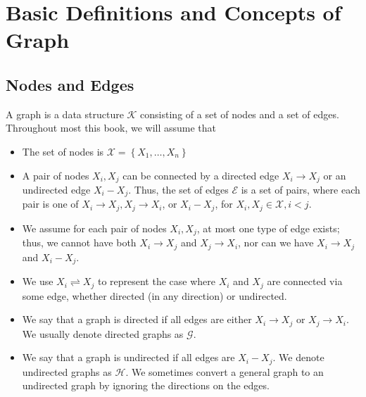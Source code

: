 \documentclass{article}
\begin{document}
\section{Basic Definitions and Concepts of Graph}
\subsection{Nodes and Edges}
A graph is a data structure $\mathcal{K}$ consisting of a set of nodes and a set of edges. Throughout most this book, we will assume that
\begin{itemize}
    \item The set of nodes is $\mathcal{X}=\left\{X_{1}, \ldots, X_{n}\right\}$
    \item A pair of nodes $X_{i}, X_{j}$ can be connected by a directed edge $X_{i} \rightarrow X_{j}$ or an undirected edge $X_{i}-X_{j}$. Thus, the set of edges $\mathcal{E}$ is a set of pairs, where each pair is one of $X_{i} \rightarrow X_{j}, X_{j} \rightarrow X_{i}$, or $X_{i}-X_{j}$, for $X_{i}, X_{j} \in \mathcal{X}, i<j$.
    \item  We assume  for each pair of nodes $X_{i}, X_{j}$, at most one type of edge exists; thus, we cannot have both $X_{i} \rightarrow X_{j}$ and $X_{j} \rightarrow X_{i}$, nor can we have $X_{i} \rightarrow X_{j}$ and $X_{i}-X_{j}$.
    \item We use $X_{i} \rightleftharpoons X_{j}$ to represent the case where $X_{i}$ and $X_{j}$ are connected via some edge, whether directed (in any direction) or undirected.
    \item {} We say that a graph is directed if all edges are either $X_{i} \rightarrow X_{j}$ or $X_{j} \rightarrow X_{i}$. We usually denote directed graphs as $\mathcal{G}$.
    \item {} We say that a graph is undirected if all edges are $X_{i}-X_{j}$. We denote undirected graphs as $\mathcal{H}$. We sometimes convert a general graph to an undirected graph by ignoring the directions on the edges.
\end{itemize}
\end{document}
